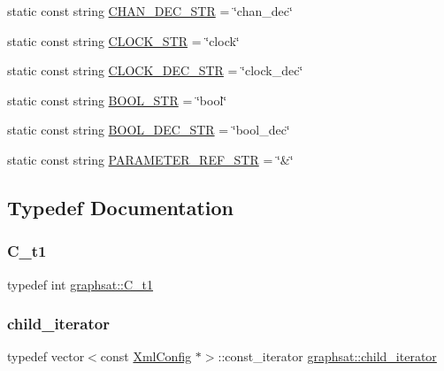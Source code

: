 \begin{DoxyCompactItemize}
static const string \mbox{\hyperlink{namespacegraphsat_a61808bcb605cc36d46ffb6128f9a10d2}{C\+H\+A\+N\+\_\+\+D\+E\+C\+\_\+\+S\+TR}} = \char`\"{}chan\+\_\+dec\char`\"{}
\item 
static const string \mbox{\hyperlink{namespacegraphsat_a94c933e9e8b5da717db99d2c20747278}{C\+L\+O\+C\+K\+\_\+\+S\+TR}} = \char`\"{}clock\char`\"{}
\item 
static const string \mbox{\hyperlink{namespacegraphsat_a1a5d25b03d0c62b730d9eec5f916ece0}{C\+L\+O\+C\+K\+\_\+\+D\+E\+C\+\_\+\+S\+TR}} = \char`\"{}clock\+\_\+dec\char`\"{}
\item 
static const string \mbox{\hyperlink{namespacegraphsat_ae8b44e2e55411efb34b652a3e85bf258}{B\+O\+O\+L\+\_\+\+S\+TR}} = \char`\"{}bool\char`\"{}
\item 
static const string \mbox{\hyperlink{namespacegraphsat_a269b206579756e8974a5efe610e10a9e}{B\+O\+O\+L\+\_\+\+D\+E\+C\+\_\+\+S\+TR}} = \char`\"{}bool\+\_\+dec\char`\"{}
\item 
static const string \mbox{\hyperlink{namespacegraphsat_aca777a0d8a8c90ed3edfbd5818865270}{P\+A\+R\+A\+M\+E\+T\+E\+R\+\_\+\+R\+E\+F\+\_\+\+S\+TR}} = \char`\"{}\&\char`\"{}
\end{DoxyCompactItemize}


\subsection{Typedef Documentation}
\mbox{\label{namespacegraphsat_af82e57b58a5af8441762469b70c475da}} 
\subsubsection{\texorpdfstring{C\_t1}{C\_t1}}
{\footnotesize\ttfamily typedef int \mbox{\hyperlink{namespacegraphsat_af82e57b58a5af8441762469b70c475da}{graphsat\+::\+C\+\_\+t1}}}

\mbox{\label{namespacegraphsat_af6dd75b1115bf1e0c83a8c0284d39f91}} 
\subsubsection{\texorpdfstring{child\_iterator}{child\_iterator}}
{\footnotesize\ttfamily typedef vector$<$const \mbox{\hyperlink{classgraphsat_1_1_xml_config}{Xml\+Config}} $\ast$$>$\+::const\+\_\+iterator \mbox{\hyperlink{namespacegraphsat_af6dd75b1115bf1e0c83a8c0284d39f91}{graphsat\+::child\+\_\+iterator}}}

